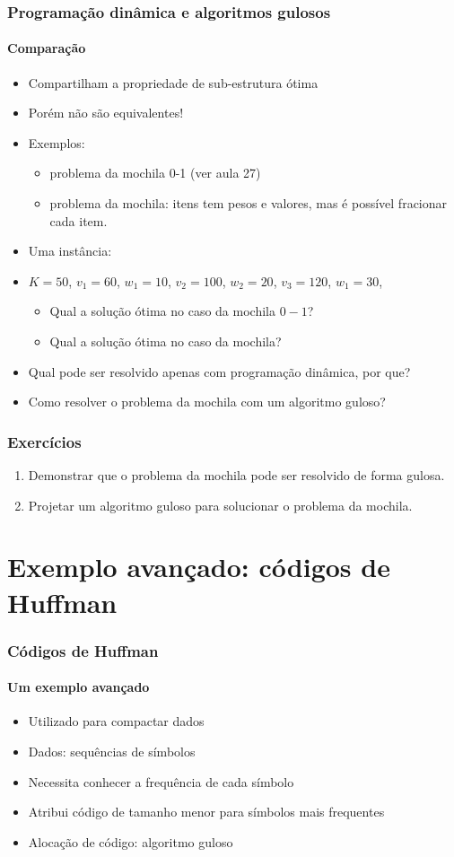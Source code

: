 \documentclass{beamer}
\begin{document}

\begin{frame}
\frametitle{Programação dinâmica e algoritmos gulosos}
\framesubtitle{Comparação}

\begin{itemize}
\item Compartilham a propriedade de sub-estrutura ótima
\item Porém não são equivalentes!
\item Exemplos:
\begin{itemize}
\item problema da mochila 0-1 (ver aula 27)
\item problema da mochila: itens tem pesos e valores, mas é possível fracionar
  cada item.
\end{itemize}
\item Uma instância: \item $K = 50$, $v_1 = 60$, $w_1 = 10$, $v_2 = 100$, $w_2 = 20$, $v_3 = 120$, $w_1 = 30$, 
\begin{itemize}
\item Qual a solução ótima no caso da mochila $0-1$?
\item Qual a solução ótima no caso da mochila?
\end{itemize}
\item Qual pode ser resolvido apenas com programação dinâmica, por que?
\pause
\item Como resolver o problema da mochila com um algoritmo guloso?
\end{itemize}
\end{frame}


\begin{frame}
\frametitle{Exercícios}
\begin{enumerate}
\item Demonstrar que o problema da mochila pode ser resolvido de forma gulosa.
\item Projetar um algoritmo guloso para solucionar o problema da mochila.
\end{enumerate}
\end{frame}

\section{Exemplo avançado: códigos de Huffman}
\begin{frame}
\frametitle{Códigos de Huffman}
\framesubtitle{Um exemplo avançado}

\begin{itemize}
\item Utilizado para compactar dados
\item Dados: sequências de símbolos
\item Necessita conhecer a frequência de cada símbolo
\item Atribui código de tamanho menor para símbolos mais frequentes
\item Alocação de código: algoritmo guloso
\end{itemize}

\end{frame}
\end{document}
